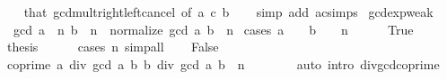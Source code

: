 \begin{isabellebody}
%
\isadelimproof
\ \ %
\endisadelimproof
%
\isatagproof
{}\isamarkupfalse%
\ that\ gcd{\isacharunderscore}{\kern0pt}mult{\isacharunderscore}{\kern0pt}right{\isacharunderscore}{\kern0pt}left{\isacharunderscore}{\kern0pt}cancel\ {\isacharbrackleft}{\kern0pt}of\ a\ c\ b{\isacharbrackright}{\kern0pt}\isanewline
\ \ \isamarkupfalse%
\ {\isacharparenleft}{\kern0pt}simp\ add{\isacharcolon}{\kern0pt}\ ac{\isacharunderscore}{\kern0pt}simps{\isacharparenright}{\kern0pt}%
\endisatagproof
{\isafoldproof}%
%
\isadelimproof
\isanewline
%
\endisadelimproof
\isanewline
{}\isamarkupfalse%
\ gcd{\isacharunderscore}{\kern0pt}exp{\isacharunderscore}{\kern0pt}weak{\isacharcolon}{\kern0pt}\isanewline
\ \ {\isachardoublequoteopen}gcd\ {\isacharparenleft}{\kern0pt}a\ {\isacharcircum}{\kern0pt}\ n{\isacharparenright}{\kern0pt}\ {\isacharparenleft}{\kern0pt}b\ {\isacharcircum}{\kern0pt}\ n{\isacharparenright}{\kern0pt}\ {\isacharequal}{\kern0pt}\ normalize\ {\isacharparenleft}{\kern0pt}gcd\ a\ b\ {\isacharcircum}{\kern0pt}\ n{\isacharparenright}{\kern0pt}{\isachardoublequoteclose}\isanewline
%
\isadelimproof
%
\endisadelimproof
%
\isatagproof
{}\isamarkupfalse%
\ {\isacharparenleft}{\kern0pt}cases\ {\isachardoublequoteopen}a\ {\isacharequal}{\kern0pt}\ {}\ {\isasymand}\ b\ {\isacharequal}{\kern0pt}\ {}\ {\isasymor}\ n\ {\isacharequal}{\kern0pt}\ {}{\isachardoublequoteclose}{\isacharparenright}{\kern0pt}\isanewline
\ \ \isamarkupfalse%
\ True\isanewline
\ \ \isamarkupfalse%
\ \isamarkupfalse%
\ {\isacharquery}{\kern0pt}thesis\isanewline
\ \ \ \ \isamarkupfalse%
\ {\isacharparenleft}{\kern0pt}cases\ n{\isacharparenright}{\kern0pt}\ simp{\isacharunderscore}{\kern0pt}all\isanewline
{}\isamarkupfalse%
\isanewline
\ \ \isamarkupfalse%
\ False\isanewline
\ \ \isamarkupfalse%
\ \isamarkupfalse%
\ {\isachardoublequoteopen}coprime\ {\isacharparenleft}{\kern0pt}a\ div\ gcd\ a\ b{\isacharparenright}{\kern0pt}\ {\isacharparenleft}{\kern0pt}b\ div\ gcd\ a\ b{\isacharparenright}{\kern0pt}{\isachardoublequoteclose}\ \ {\isachardoublequoteopen}n\ {\isachargreater}{\kern0pt}\ {}{\isachardoublequoteclose}\isanewline
\ \ \ \ \isamarkupfalse%
\ {\isacharparenleft}{\kern0pt}auto\ intro{\isacharcolon}{\kern0pt}\ div{\isacharunderscore}{\kern0pt}gcd{\isacharunderscore}{\kern0pt}coprime{\isacharparenright}{\kern0pt}\isanewline
\ \ \isamarkupfalse%

\end{isabellebody}
